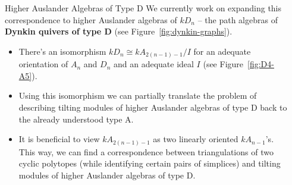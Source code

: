 \documentclass[final]{beamer}
\newlength{\sepwidth}
\newlength{\colwidth}
\newcommand{\separatorcolumn}{\begin{column}{\sepwidth}\end{column}}
\begin{document}
\begin{frame}[t]
\begin{columns}[t]
\separatorcolumn

\begin{column}{\colwidth}
 \begin{alertblock}{Higher Auslander Algebras of Type D}
  We currently work on expanding this correspondence to higher Auslander
  algebras of $kD_n$ -- the path algebras of \textbf{Dynkin quivers of type D}
  (see Figure~\ref{fig:dynkin-graphs}).
  \begin{itemize}
   \vspace*{-12pt}
   \item There's an isomorphism $kD_n \cong kA_{2(n-1) - 1} / I$ for an adequate
    orientation of $A_n$ and $D_n$ and an adequate ideal $I$ (see
    Figure~\ref{fig:D4-A5}).
   \item Using this isomorphism we can partially translate the problem of
    describing tilting modules of higher Auslander algebras of type D back to
    the already understood type A.
   \item It is beneficial to view $kA_{2(n-1) - 1}$ as two linearly oriented
    $kA_{n-1}$'s. This way, we can find a correspondence between triangulations
    of two cyclic polytopes (while identifying certain pairs of simplices)
    and tilting modules of higher Auslander algebras of type D.
  \end{itemize}
  \begin{figure}[ht]
   \centering
\end{figure}
\end{alertblock}
\end{column}
\end{columns}
\end{frame}
\end{document}

